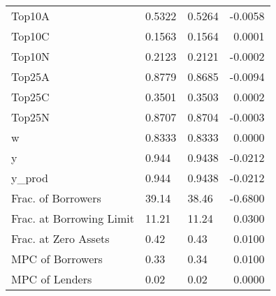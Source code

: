 \begin{table}
\begin{tabular}{lllr}
                  Top10A &  0.5322 &   0.5264 & -0.0058 \\
                  Top10C &  0.1563 &   0.1564 &  0.0001 \\
                  Top10N &  0.2123 &   0.2121 & -0.0002 \\
                  Top25A &  0.8779 &   0.8685 & -0.0094 \\
                  Top25C &  0.3501 &   0.3503 &  0.0002 \\
                  Top25N &  0.8707 &   0.8704 & -0.0003 \\
                       w &  0.8333 &   0.8333 &  0.0000 \\
                       y &   0.944 &   0.9438 & -0.0212 \\
                  y\_prod &   0.944 &   0.9438 & -0.0212 \\
      Frac. of Borrowers &   39.14 &    38.46 & -0.6800 \\
Frac. at Borrowing Limit &   11.21 &    11.24 &  0.0300 \\
    Frac. at Zero Assets &    0.42 &     0.43 &  0.0100 \\
        MPC of Borrowers &    0.33 &     0.34 &  0.0100 \\
          MPC of Lenders &    0.02 &     0.02 &  0.0000 \\
\bottomrule
\end{tabular}
\end{table}
